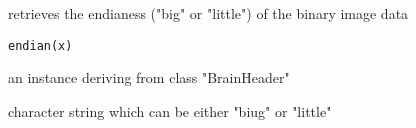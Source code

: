 \begin{Description}\relax
retrieves the endianess ("big" or "little") of the binary image data
\end{Description}
\begin{Usage}
\begin{verbatim}
endian(x)
\end{verbatim}
\end{Usage}
\begin{Arguments}
\begin{ldescription}
\item[\code{x}] an instance deriving from class "BrainHeader" 
\end{ldescription}
\end{Arguments}
\begin{Value}
character string which can be either "biug" or "little"
\end{Value}

